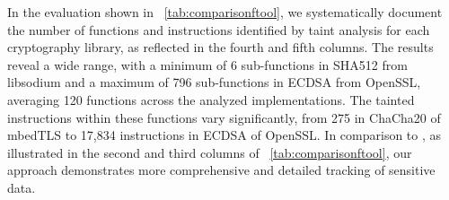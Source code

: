 In the evaluation shown in \T~\ref{tab:comparisonftool}, we systematically document the number of functions and instructions identified by taint analysis for each cryptography library, as reflected in the fourth and fifth columns. 
The results reveal a wide range, with a minimum of 6 sub-functions in SHA512 from libsodium and a maximum of 796 sub-functions in ECDSA from OpenSSL, averaging 120 functions across the analyzed implementations. 
The tainted instructions within these functions vary significantly, from 275 in ChaCha20 of mbedTLS to 17,834 instructions in ECDSA of OpenSSL. 
In comparison to \ftool, as illustrated in the second and third columns of \T~\ref{tab:comparisonftool}, our approach demonstrates more comprehensive and detailed tracking of sensitive data.

\begin{table*}[!htbp]
\centering
\caption{Performance comparison with \ftool\ based on the same number of tainted functions. The replication of \ftool\ is conducted on its \textsc{Fast} version.}
\label{tab:comparisonftool}
\footnotesize
{}
\end{table*}
